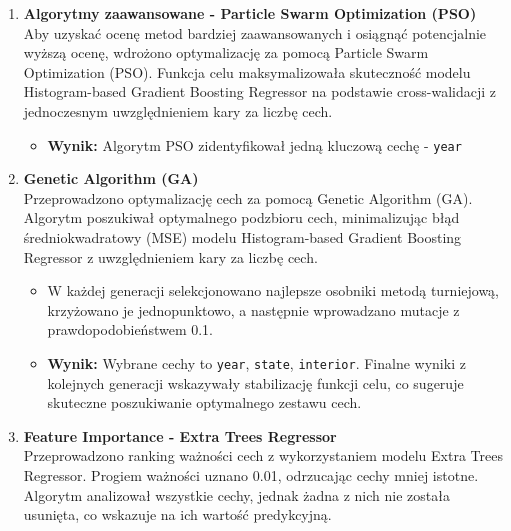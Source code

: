 \documentclass[10pt,letterpaper]{article}
\begin{document}
\begin{enumerate}
	\item \textbf{Algorytmy zaawansowane - Particle Swarm Optimization (PSO)}\\
	Aby uzyskać ocenę metod bardziej zaawansowanych i osiągnąć potencjalnie wyższą ocenę, wdrożono optymalizację za pomocą Particle Swarm Optimization (PSO). Funkcja celu maksymalizowała skuteczność modelu Histogram-based Gradient Boosting Regressor na podstawie cross-walidacji z jednoczesnym uwzględnieniem kary za liczbę cech.
	\begin{itemize}
		\item \textbf{Wynik:} Algorytm PSO zidentyfikował jedną kluczową cechę - \texttt{year}
	\end{itemize}
	
	\item \textbf{Genetic Algorithm (GA)}\\
	Przeprowadzono optymalizację cech za pomocą Genetic Algorithm (GA). Algorytm poszukiwał optymalnego podzbioru cech, minimalizując błąd średniokwadratowy (MSE) modelu Histogram-based Gradient Boosting Regressor z uwzględnieniem kary za liczbę cech.
	\begin{itemize}
		\item W każdej generacji selekcjonowano najlepsze osobniki metodą turniejową, krzyżowano je jednopunktowo, a następnie wprowadzano mutacje z prawdopodobieństwem 0.1.
		\item \textbf{Wynik:} Wybrane cechy to \texttt{year}, \texttt{state}, \texttt{interior}. Finalne wyniki z kolejnych generacji wskazywały stabilizację funkcji celu, co sugeruje skuteczne poszukiwanie optymalnego zestawu cech.
	\end{itemize}
	
	\item \textbf{Feature Importance - Extra Trees Regressor}\\
	Przeprowadzono ranking ważności cech z wykorzystaniem modelu Extra Trees Regressor. Progiem ważności uznano 0.01, odrzucając cechy mniej istotne. Algorytm analizował wszystkie cechy, jednak żadna z nich nie została usunięta, co wskazuje na ich wartość predykcyjną.
\end{enumerate}
	
\end{document}
